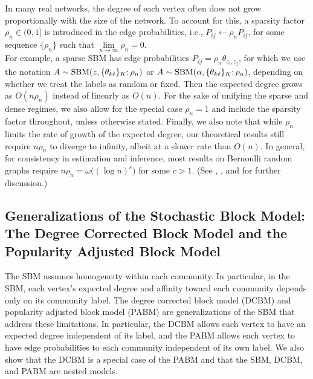 \documentclass[
  12pt,
]{article}
\theoremstyle{definition}
\theoremstyle{definition}
\theoremstyle{definition}
\theoremstyle{definition}
\theoremstyle{remark}
\begin{document}
In many real networks, the degree of each vertex often does not grow proportionally with the size of the network.
To account for this, a sparsity factor \(\rho_n \in (0, 1]\) is introduced in the edge probabilities, i.e., \(P_{ij} \leftarrow \rho_n P_{ij}\), for some sequence \(\{\rho_n\}\) such that \(\lim\limits_{n \to \infty} \rho_n = 0\).\\
For example, a sparse SBM has edge probabilities \(P_{ij} = \rho_n \theta_{z_i, z_j}\), for which we use the notation \(A \sim \mathrm{SBM}(z, \{\theta_{k \ell}\}_K; \rho_n)\) or \(A \sim \mathrm{SBM}(\alpha, \{\theta_{k \ell}\}_K; \rho_n)\), depending on whether we treat the labels as random or fixed.
Then the expected degree grows as \(O(n \rho_n)\) instead of linearly as \(O(n)\).
For the sake of unifying the sparse and dense regimes, we also allow for the special case \(\rho_n = 1\) and include the sparsity factor throughout, unless otherwise stated.
Finally, we also note that while \(\rho_n\) limits the rate of growth of the expected degree, our theoretical results still require \(n \rho_n\) to diverge to infinity, albeit at a slower rate than \(O(n)\).
In general, for consistency in estimation and inference, most results on Bernoulli random graphs require \(n \rho_n = \omega \big( (\log n)^c \big)\) for some \(c > 1\).
(See \cite{JMLR:v18:16-480}, \cite{https://doi.org/10.48550/arxiv.2106.09840}, and \cite{rubindelanchy2017statistical} for further discussion.)

\hypertarget{sec:dcbm-pabm}{%
\subsection{Generalizations of the Stochastic Block Model: The Degree Corrected Block Model and the Popularity Adjusted Block Model}\label{sec:dcbm-pabm}}

The SBM assumes homogeneity within each community.
In particular, in the SBM, each vertex's expected degree and affinity toward each community depends only on its community label.
The degree corrected block model (DCBM) and popularity adjusted block model (PABM) are generalizations of the SBM that address these limitations.
In particular, the DCBM allows each vertex to have an expected degree independent of its label, and the PABM allows each vertex to have edge probabilities to each community independent of its own label.
We also show that the DCBM is a special case of the PABM and that the SBM, DCBM, and PABM are nested models.
\end{document}
